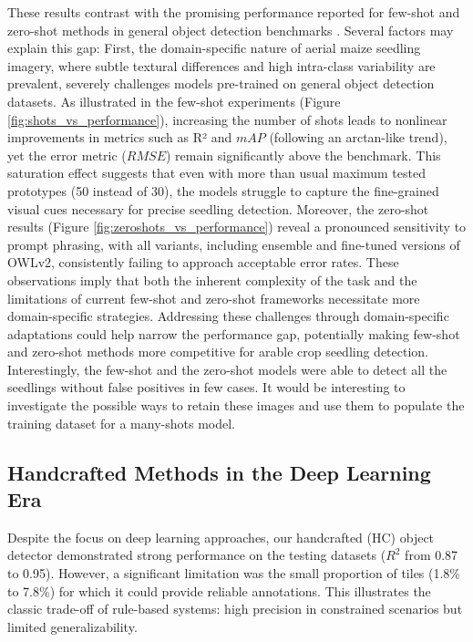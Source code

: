 \documentclass[12pt,a4paper,oneside]{report}
\begin{document}
These results contrast with the promising performance reported for few-shot and zero-shot methods 
in general object detection benchmarks \cite{xuDeViTDecomposingVision2023,mindererScalingOpenVocabularyObject2023}. 
Several factors may explain this gap: 
First, the domain-specific nature of aerial maize seedling imagery, where subtle 
textural differences and high intra-class variability are prevalent, severely challenges 
models pre-trained on general object detection datasets. As illustrated in the few-shot 
experiments (Figure \ref{fig:shots_vs_performance}), increasing 
the number of shots leads to nonlinear improvements in metrics such as R² and $mAP$ 
(following an arctan-like trend), yet the error metric ($RMSE$) remain significantly 
above the benchmark. This saturation effect suggests that even with more than usual maximum tested
prototypes (50 instead of 30), the models struggle to capture the fine-grained visual cues 
necessary for precise seedling detection. Moreover, the zero-shot results (Figure 
\ref{fig:zeroshots_vs_performance}) reveal a pronounced sensitivity to prompt phrasing, with all 
variants, including ensemble and fine-tuned versions of OWLv2, consistently failing 
to approach acceptable error rates. These observations imply that both the inherent 
complexity of the task and the limitations of current few-shot and zero-shot frameworks 
necessitate more domain-specific strategies. Addressing these challenges through 
domain-specific adaptations could help narrow the performance gap, potentially making 
few-shot and zero-shot methods more competitive for arable crop seedling detection.
Interestingly, the few-shot and the zero-shot models were able to detect all the seedlings
without false positives in few cases. It would be interesting to investigate the
possible ways to retain these images and use them to populate the training dataset
for a many-shots model.

\subsection{Handcrafted Methods in the Deep Learning Era}
Despite the focus on deep learning approaches, our handcrafted (HC) object detector 
demonstrated strong performance on the testing datasets ($R^2$ from 0.87 to 0.95). 
However, a significant limitation was the small proportion of tiles (1.8\% to 7.8\%) 
for which it could provide reliable annotations. This illustrates the classic trade-off 
of rule-based systems: high precision in constrained scenarios but limited generalizability.
\end{document}
